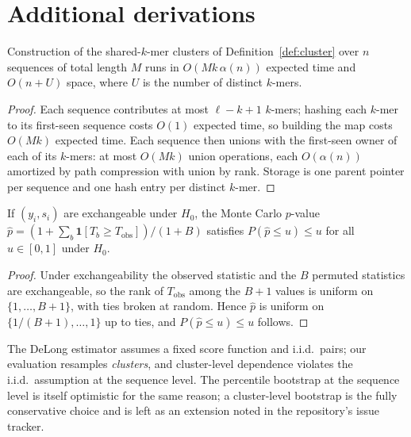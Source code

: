 \section{Additional derivations}\label{app:math}
\begin{lemma}
Construction of the shared-$k$-mer clusters of Definition~\ref{def:cluster}
over $n$ sequences of total length $M$ runs in $O(M k\, \alpha(n))$ expected
time and $O(n + U)$ space, where $U$ is the number of distinct $k$-mers.
\end{lemma}
\begin{proof}
Each sequence contributes at most $\ell - k + 1$ $k$-mers; hashing each
$k$-mer to its first-seen sequence costs $O(1)$ expected time, so building
the map costs $O(Mk)$ expected time. Each sequence then unions with the
first-seen owner of each of its $k$-mers: at most $O(Mk)$ union operations,
each $O(\alpha(n))$ amortized by path compression with union by rank.
Storage is one parent pointer per sequence and one hash entry per distinct
$k$-mer.
\end{proof}

\begin{proposition}
If $(y_i, s_i)$ are exchangeable under $H_0$, the Monte Carlo $p$-value
$\hat p = (1 + \sum_b \mathbf{1}[T_b \ge T_{\mathrm{obs}}])/(1+B)$ satisfies
$P(\hat p \le u) \le u$ for all $u \in [0,1]$ under $H_0$.
\end{proposition}
\begin{proof}
Under exchangeability the observed statistic and the $B$ permuted statistics
are exchangeable, so the rank of $T_{\mathrm{obs}}$ among the $B+1$ values is
uniform on $\{1,\dots,B+1\}$, with ties broken at random. Hence
$\hat p$ is uniform on $\{1/(B+1), \dots, 1\}$ up to ties, and
$P(\hat p \le u) \le u$ follows.
\end{proof}

\begin{remark}
The DeLong estimator assumes a fixed score function and i.i.d.\ pairs; our
evaluation resamples \emph{clusters}, and cluster-level dependence violates
the i.i.d.\ assumption at the sequence level. The percentile bootstrap at the
sequence level is itself optimistic for the same reason; a cluster-level
bootstrap is the fully conservative choice and is left as an extension
noted in the repository's issue tracker.
\end{remark}
